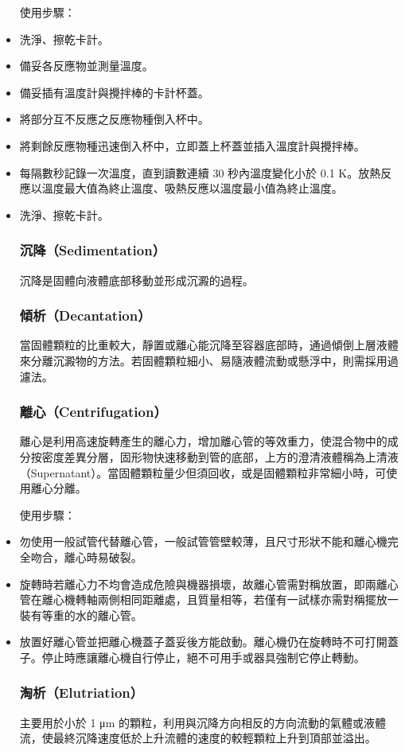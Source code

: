 \documentclass[a4paper,12pt]{article}
\begin{document}
\begin{itemize}
使用步驟：
\ben
\item 洗淨、擦乾卡計。
\item 備妥各反應物並測量溫度。
\item 備妥插有溫度計與攪拌棒的卡計杯蓋。
\item 將部分互不反應之反應物種倒入杯中。
\item 將剩餘反應物種迅速倒入杯中，立即蓋上杯蓋並插入溫度計與攪拌棒。
\item 每隔數秒記錄一次溫度，直到讀數連續 30 秒內溫度變化小於 0.1 K。放熱反應以溫度最大值為終止溫度、吸熱反應以溫度最小值為終止溫度。
\item 洗淨、擦乾卡計。
\een
{}
\subsubsection{沉降（Sedimentation）}
沉降是固體向液體底部移動並形成沉澱的過程。
\subsubsection{傾析（Decantation）}
當固體顆粒的比重較大，靜置或離心能沉降至容器底部時，通過傾倒上層液體來分離沉澱物的方法。若固體顆粒細小、易隨液體流動或懸浮中，則需採用過濾法。
\subsubsection{離心（Centrifugation）}
離心是利用高速旋轉產生的離心力，增加離心​管的等效重力，使混合物中的成分按密度差異分層，固形物快速移動到管的底部，上方的澄清液體稱為上清液（Supernatant）。當固體顆粒量少但須回收，或是固體顆粒非常細小時，可使用離心分離。

使用步驟：
\ben
\item 勿使用一般試管代替離心管，一般試管管壁較薄，且尺寸形狀不能和離心機完全吻合，離心時易破裂。
\item 旋轉時若離心力不均會造成危險與機器損壞，故離心管需對稱放置，即兩離心管在離心機轉軸兩側相同距離處，且質量相等，若僅有一試樣亦需對稱擺放一裝有等重的水的離心管。
\item 放置好離心管並把離心機蓋子蓋妥後方能啟動。離心機仍在旋轉時不可打開蓋子。停止時應讓離心機自行停止，絕不可用手或器具強制它停止轉動。
\een
\subsubsection{淘析（Elutriation）}
主要用於小於 1 μm 的顆粒，利用與沉降方向相反的方向流動的氣體或液體流，使最終沉降速度低於上升流體的速度的較輕顆粒上升到頂部並溢出。

\end{itemize}
\end{document}
